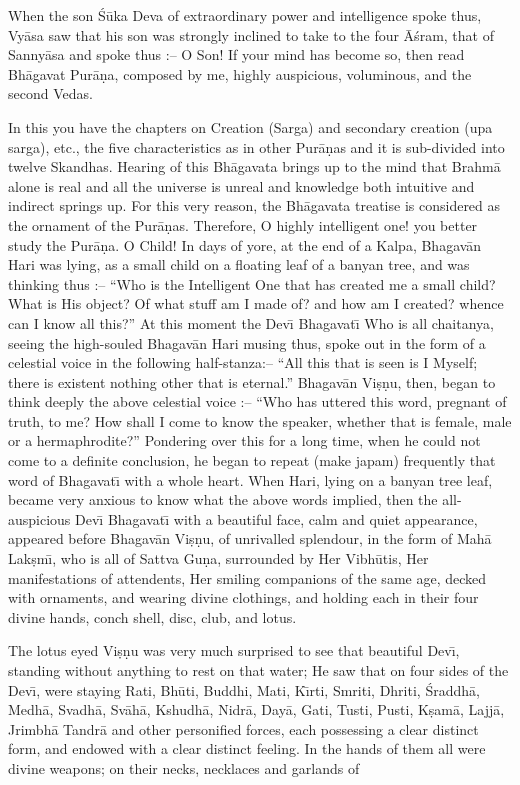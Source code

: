 When the son \'S\=uka Deva of extraordinary power and intelligence spoke thus, Vy\=asa saw that his son was strongly inclined to take to the four \=A\'sram, that of Sanny\=asa and spoke thus :-- O Son! If your mind has become so, then read Bh\=agavat Pur\=a\d{n}a, composed by me, highly auspicious, voluminous, and the second Vedas.

In this you have the chapters on Creation (Sarga) and secondary creation (upa sarga), etc., the five characteristics as in other Pur\=a\d{n}as and it is sub-divided into twelve Skandhas. Hearing of this Bh\=agavata brings up to the mind that Brahm\=a alone is real and all the universe is unreal and knowledge both intuitive and indirect springs up. For this very reason, the Bh\=agavata treatise is considered as the ornament of the Pur\=a\d{n}as. Therefore, O highly intelligent one! you better study the Pur\=a\d{n}a. O Child! In days of yore, at the end of a Kalpa, Bhagav\=an Hari was lying, as a small child on a floating leaf of a banyan tree, and was thinking thus :-- ``Who is the Intelligent One that has created me a small child? What is His object? Of what stuff am I made of? and how am I created? whence can I know all this?'' At this moment the Dev\={\i} Bhagavat\={\i} Who is all chaitanya, seeing the high-souled Bhagav\=an Hari musing thus, spoke out in the form of a celestial voice in the following half-stanza:-- ``All this that is seen is I Myself; there is existent nothing other that is eternal.'' Bhagav\=an Vi\d{s}\d{n}u, then, began to think deeply the above celestial voice :-- ``Who has uttered this word, pregnant of truth, to me? How shall I come to know the speaker, whether that is female, male or a hermaphrodite?'' Pondering over this for a long time, when he could not come to a definite conclusion, he began to repeat (make japam) frequently that word of Bhagavat\={\i} with a whole heart. When Hari, lying on a banyan tree leaf, became very anxious to know what the above words implied, then the all-auspicious Dev\={\i} Bhagavat\={\i} with a beautiful face, calm and quiet appearance, appeared before Bhagav\=an Vi\d{s}\d{n}u, of unrivalled splendour, in the form of Mah\=a Lak\d{s}m\={\i}, who is all of Sattva Gu\d{n}a, surrounded by Her Vibh\=utis, Her manifestations of attendents, Her smiling companions of the same age, decked with ornaments, and wearing divine clothings, and holding each in their four divine hands, conch shell, disc, club, and lotus.

The lotus eyed Vi\d{s}\d{n}u was very much surprised to see that beautiful Dev\={\i}, standing without anything to rest on that water; He saw that on four sides of the Dev\={\i}, were staying Rati, Bh\=uti, Buddhi, Mati, K\={\i}rti, Smriti, Dhriti, \'Sraddh\=a, Medh\=a, Svadh\=a, Sv\=ah\=a, Kshudh\=a, Nidr\=a, Day\=a, Gati, Tusti, Pusti, K\d{s}am\=a, Lajj\=a, Jrimbh\=a Tandr\=a and other personified forces, each possessing a clear distinct form, and endowed with a clear distinct feeling. In the hands of them all were divine weapons; on their necks, necklaces and garlands of

